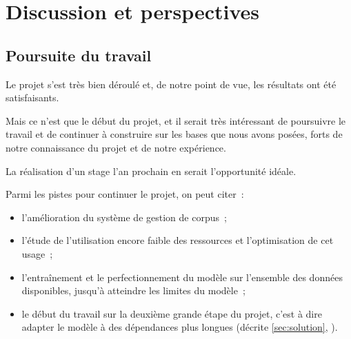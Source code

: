 \section{Discussion et perspectives}
\subsection{Poursuite du travail}
Le projet s'est très bien déroulé et, de notre point de vue, les résultats ont été satisfaisants.

Mais ce n'est que le début du projet, et il serait très intéressant de poursuivre le travail et de continuer à construire sur les bases que nous avons posées, forts de notre connaissance du projet et de notre expérience.

La réalisation d'un stage l'an prochain en serait l'opportunité idéale.

Parmi les pistes pour continuer le projet, on peut citer~:
\begin{itemize}
	\item l'amélioration du système de gestion de corpus~;
	\item l'étude de l'utilisation encore faible des ressources et l'optimisation de cet usage~;
	\item l'entraînement et le perfectionnement du modèle sur l'ensemble des données disponibles, jusqu'à atteindre les limites du modèle~;
	\item le début du travail sur la deuxième grande étape du projet, c'est à dire adapter le modèle à des dépendances plus longues (décrite \autoref{sec:solution}, ).
\end{itemize}
